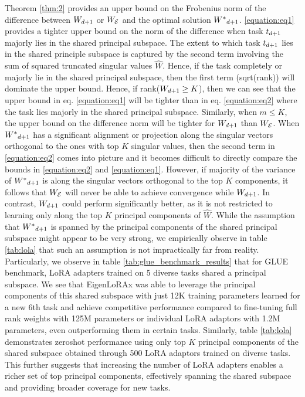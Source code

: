 Theorem \ref{thm:2} provides an upper bound on the Frobenius norm of the difference between $W_{d+1}$ or $W_{\mathcal{E}}$ and the optimal solution ${W^*}_{d+1}$. \ref{equation:eq1} provides a tighter upper bound on the norm of the difference when task $t_{d+1}$ majorly lies in the shared principal subspace. The extent to which task $t_{d+1}$ lies in the shared principle subspace is captured by the second term involving the sum of squared truncated singular values $\hat{W}$. Hence, if the task completely or majorly lie in the shared principal subspace, then the first term (sqrt(rank)) will dominate the upper bound.  Hence, if rank($W_{d+1}\geq K$), then we can see that the upper bound in eq. \ref{equation:eq1} will be tighter than in eq. \ref{equation:eq2} where the task lies majorly in the shared principal subspace. Similarly, when $m\leq K$, the upper bound on the difference norm will be tighter for $W_{d+1}$ than $W_{\mathcal{E}}$.  When ${W^*}_{d+1}$ has a significant alignment or projection along the singular vectors orthogonal to the ones with top $K$ singular values, then the second term in \ref{equation:eq2} comes into picture and it becomes difficult to directly compare the bounds in \ref{equation:eq2} and \ref{equation:eq1}. However, if majority of the variance of ${W^*}_{d+1}$ is along the singular vectors orthogonal to the top $K$ components, it follows that $W_{\mathcal{E}}$ will never be able to achieve convergence while $W_{d+1}$. In contrast, $W_{d+1}$ could perform significantly better, as it is not restricted to learning only along the top $K$ principal components of $\hat{W}$. While the assumption that ${W^*}_{d+1}$ is spanned by the principal components of the shared principal subspace might appear to be very strong, we empirically observe in table \ref{tab:lola} that such an assumption is not impractically far from reality. Particularly, we observe in table \ref{tab:glue_benchmark_results} that for GLUE benchmark, LoRA adapters trained on 5 diverse tasks shared a principal subspace. We see that EigenLoRAx was able to leverage the principal components of this shared subspace with just 12K training parameters learned for a new 6th task and achieve competitive performance compared to fine-tuning full rank weights with 125M parameters or individual LoRA adaptors with 1.2M parameters, even outperforming them in certain tasks. Similarly, table \ref{tab:lola} demonstrates zeroshot performance using only top $K$ principal components of the shared subspace obtained through 500 LoRA adaptors trained on diverse tasks. This further suggests that increasing the number of LoRA adapters enables a richer set of top principal components, effectively spanning the shared subspace and providing broader coverage for new tasks.
    
